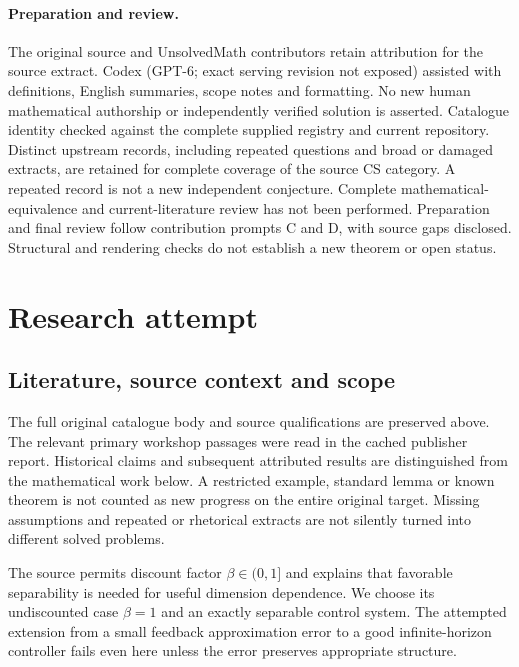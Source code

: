 \documentclass[11pt]{article}
\begin{document}
\paragraph{Preparation and review.}
The original source and UnsolvedMath contributors retain attribution for the source extract. Codex (GPT-6; exact serving revision not exposed) assisted with definitions, English summaries, scope notes and formatting. No new human mathematical authorship or independently verified solution is asserted. Catalogue identity checked against the complete supplied registry and current repository. Distinct upstream records, including repeated questions and broad or damaged extracts, are retained for complete coverage of the source CS category. A repeated record is not a new independent conjecture. Complete mathematical-equivalence and current-literature review has not been performed. Preparation and final review follow contribution prompts C and D, with source gaps disclosed. Structural and rendering checks do not establish a new theorem or open status.
\label{end:statement}

\section{Research attempt}
\subsection{Literature, source context and scope}
The full original catalogue body and source qualifications are preserved above. The relevant primary workshop passages were read in the cached publisher report. Historical claims and subsequent attributed results are distinguished from the mathematical work below. A restricted example, standard lemma or known theorem is not counted as new progress on the entire original target. Missing assumptions and repeated or rhetorical extracts are not silently turned into different solved problems.

The source permits discount factor $\beta\in(0,1]$ and explains that favorable separability is needed for useful dimension dependence. We choose its undiscounted case $\beta=1$ and an exactly separable control system. The attempted extension from a small feedback approximation error to a good infinite-horizon controller fails even here unless the error preserves appropriate structure.
\end{document}
